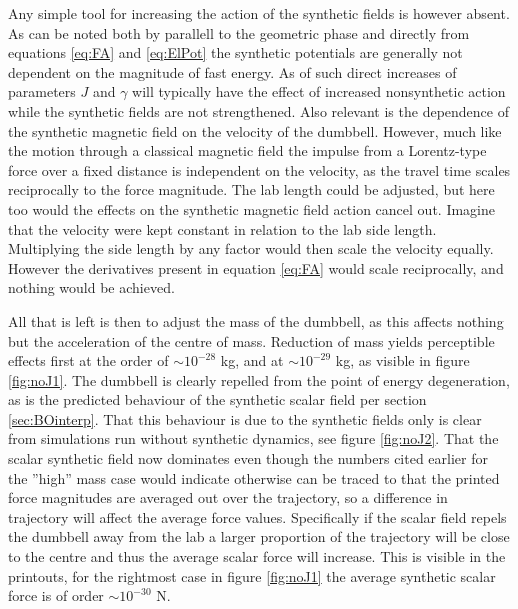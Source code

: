 \documentclass[main.tex]{subfiles}
\begin{document}
Any simple tool for increasing the action of the synthetic fields is however absent. As can
be noted both by parallell to the geometric phase and directly from equations \ref{eq:FA}
and \ref{eq:ElPot} the synthetic potentials are generally not dependent on the magnitude of
fast energy. As of such direct increases of parameters \(J\) and \(\gamma\) will typically
have the effect of increased nonsynthetic action while the synthetic fields are not
strengthened. Also relevant is the dependence of the synthetic magnetic field on the
velocity of the dumbbell. However, much like the motion through a classical magnetic field
the impulse from a Lorentz-type force over a fixed distance is independent on the velocity,
as the travel time scales reciprocally to the force magnitude. The lab length could be
adjusted, but here too would the effects on the synthetic magnetic field action cancel out.
Imagine that the velocity were kept constant in relation to the lab side length.
Multiplying the side length by any factor would then scale the velocity equally. However
the derivatives present in equation \ref{eq:FA} would scale reciprocally, and nothing would
be achieved.

All that is left is then to adjust the mass of the dumbbell, as this affects nothing but
the acceleration of the centre of mass. Reduction of mass yields perceptible effects first
at the order of \(\sim 10^{-28}\) kg, and at \(\sim 10^{-29}\) kg, as visible in figure
\ref{fig:noJ1}. %
The dumbbell is clearly repelled from the point of energy degeneration, as is the predicted
behaviour of the synthetic scalar field per section \ref{sec:BOinterp}. That this behaviour
is due to the synthetic fields only is clear from simulations run without synthetic
dynamics, see figure \ref{fig:noJ2}. That the scalar synthetic field now dominates even
though the numbers cited earlier for the ''high'' mass case would indicate otherwise can be
traced to that the printed force magnitudes are averaged out over the trajectory, so a
difference in trajectory will affect the average force values. Specifically if the scalar
field repels the dumbbell away from the lab a larger proportion of the trajectory will be
close to the centre and thus the average scalar force will increase. This is visible in the
printouts, for the rightmost case in figure \ref{fig:noJ1} the average synthetic scalar
force is of order \(\sim 10^{-30}\) N.
\end{document}
